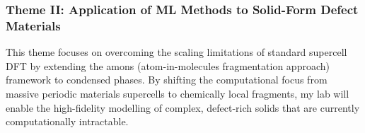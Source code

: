 \documentclass[11pt,letterpaper]{article}
\begin{document}
\subsubsection*{Theme II: Application of ML Methods to Solid-Form Defect Materials}


This theme focuses on overcoming the scaling limitations of standard supercell DFT by extending the amons (atom-in-molecules fragmentation approach) framework\cite{amons} to condensed phases. By shifting the computational focus from massive periodic materials supercells to chemically local fragments, my lab will enable the high-fidelity modelling of complex, defect-rich solids that are currently computationally intractable. 



\end{document}
